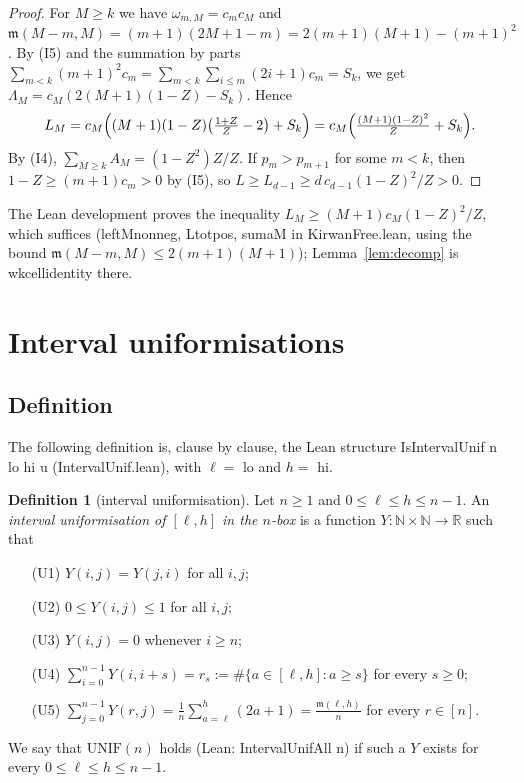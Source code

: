 \documentclass[11pt]{amsart}
\theoremstyle{definition}
\newtheorem{definition}[lemma]{Definition}
\theoremstyle{remark}
\numberwithin{equation}{section}
\newcommand{\R}{\mathbb{R}}
\newcommand{\N}{\mathbb{N}}
\newcommand{\ms}{\mathfrak{m}}
\newcommand{\leanus}{\textunderscore\allowbreak}
\newcommand{\lean}[1]{{\ttfamily\let\_\leanus #1}}
\begin{document}
\begin{proof}
For $M\ge k$ we have $\omega_{m,M}=c_mc_M$ and $\ms(M-m,M)=(m+1)(2M+1-m)=2(m+1)(M+1)-(m+1)^2$. By (I5)
and the summation by parts $\sum_{m<k}(m+1)^2c_m=\sum_{m<k}\sum_{i\le m}(2i+1)c_m=S_k$, we get
$\Lambda_M=c_M(2(M+1)(1-Z)-S_k)$. Hence
\[
  L_M=c_M\Bigl((M+1)(1-Z)\bigl(\tfrac{1+Z}{Z}-2\bigr)+S_k\Bigr)=c_M\Bigl(\tfrac{(M+1)(1-Z)^2}{Z}+S_k\Bigr).
\]
By (I4), $\sum_{M\ge k}A_M=(1-Z^2)Z/Z$. If $p_m>p_{m+1}$ for some $m<k$, then $1-Z\ge(m+1)c_m>0$ by
(I5), so $L\ge L_{d-1}\ge d\,c_{d-1}(1-Z)^2/Z>0$.
\end{proof}

The Lean development proves the inequality $L_M\ge(M+1)c_M(1-Z)^2/Z$, which suffices
(\lean{leftM\_nonneg}, \lean{Ltot\_pos}, \lean{sum\_aM} in \lean{KirwanFree.lean}, using the bound
$\ms(M-m,M)\le2(m+1)(M+1)$); Lemma~\ref{lem:decomp} is \lean{wk\_cell\_identity} there.

\section{Interval uniformisations}\label{sec:unif}

\subsection{Definition}
The following definition is, clause by clause, the Lean structure \lean{IsIntervalUnif n lo hi u}
(\lean{IntervalUnif.lean}), with $\ell=$ \lean{lo} and $h=$ \lean{hi}.

\begin{definition}[interval uniformisation]\label{def:unif}
Let $n\ge1$ and $0\le\ell\le h\le n-1$. An \emph{interval uniformisation of $[\ell,h]$ in the $n$-box} is
a function $Y:\N\times\N\to\R$ such that
\begin{enumerate}
\item[(U1)] $Y(i,j)=Y(j,i)$ for all $i,j$;
\item[(U2)] $0\le Y(i,j)\le1$ for all $i,j$;
\item[(U3)] $Y(i,j)=0$ whenever $i\ge n$;
\item[(U4)] $\sum_{i=0}^{n-1}Y(i,i+s)=r_s:=\#\{a\in[\ell,h]:a\ge s\}$ for every $s\ge0$;
\item[(U5)] $\sum_{j=0}^{n-1}Y(r,j)=\frac1n\sum_{a=\ell}^{h}(2a+1)=\frac{\ms(\ell,h)}{n}$ for every $r\in[n]$.
\end{enumerate}
We say that $\mathrm{UNIF}(n)$ holds (Lean: \lean{IntervalUnifAll n}) if such a $Y$ exists for every
$0\le\ell\le h\le n-1$.
\end{definition}
\end{document}
